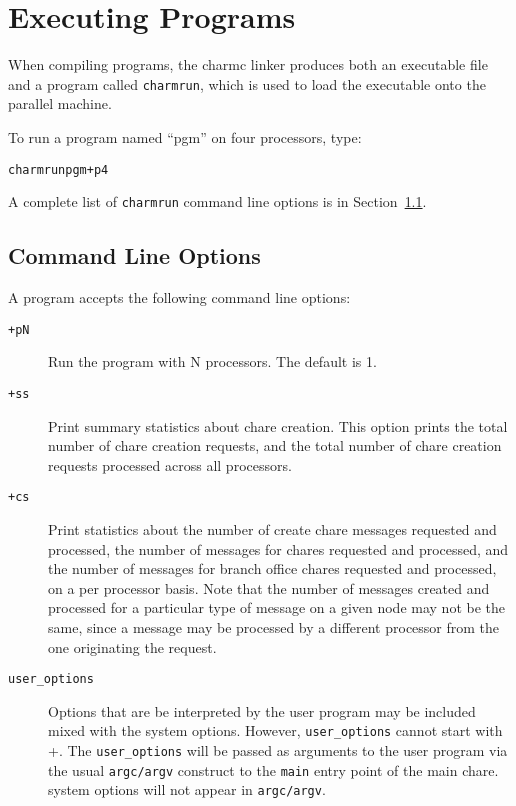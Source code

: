 \section{Executing \charmpp{} Programs}
\label{executing charm programs}

When compiling \charmpp{} programs, the charmc linker produces 
both an executable file and a program called {\tt charmrun},
which is used to load the executable onto the parallel machine.

To run a \charmpp{} program named ``pgm'' on four processors, type:
\begin{alltt}
charmrun pgm +p4
\end{alltt}

A complete list of {\tt charmrun} command line options is in 
Section~\ref{command line options}.


\subsection[Command Line Options]{Command Line Options}
\label{command line options}

A \charmpp{} program accepts the following command line options:
\begin{description}

\item[{\tt +pN}] Run the program with N processors. The default is 1.

\item[{\tt +ss}] Print summary statistics about chare creation.  This option
prints the total number of chare creation requests, and the total number of
chare creation requests processed across all processors.

\item[{\tt +cs}] Print statistics about the number of create chare messages
requested and processed, the number of messages for chares requested and 
processed, and the number of messages for branch office chares requested and
processed, on a per processor basis.  Note that the number of messages 
created and processed for a particular type of message on a given node 
may not be the same, since a message may be processed by a different
processor from the one originating the request.

\item[{\tt user\_options}] Options that are be interpreted by the user
program may be included mixed with the system options. 
However, {\tt user\_options} cannot start with +.
The {\tt user\_options} will be passed as arguments to the user program 
via the usual {\tt argc/argv} construct to the {\tt main}
entry point of the main chare. 
\charmpp{} system options will not appear in {\tt argc/argv}.

\end{description}




